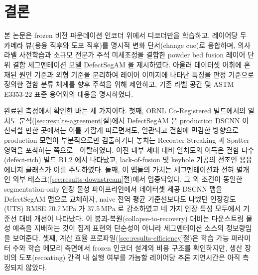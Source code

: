 \section{결론}
\label{sec:conclusion}

본 논문은 frozen 비전 파운데이션 인코더 위에서 디코더만을 학습하고,
레이어당 두 카메라 뷰(용융 직후와 도포 직후)를 명시적 변화 단서(change
cue)로 융합하며, 의사 라벨 사전학습과 소규모 전문가 주석 미세조정을
결합한 powder bed fusion 레이어 단위 결함 세그멘테이션 모델
DefectSegAM 을 제시하였다. 아울러 데이터셋 어휘에 혼재된 원인 기준과
외형 기준을 분리하여 레이어 이미지에 나타난 특징을 판정 기준으로 정의한
결함 분류 체계를 향후 주석을 위해 제안하고, 기존 라벨 공간 및 ASTM
E3353-22 표준 용어와의 대응을 명시하였다.

완료된 측정에서 확인한 바는 세 가지이다. 첫째, ORNL Co-Registered
빌드에서의 일치도 분석(\ref{sec:results-agreement}절)에서 DefectSegAM 은
production DSCNN 이 신뢰할 만한 곳에서는 이를 가깝게 따르면서도, 일관되고
결함에 민감한 방향으로---production 모델이 부분적으로만 검출하거나
놓치는 Recoater Streaking 과 Spatter 영역을 포착하는 쪽으로---이탈하였다.
이전 내부 세대 대비 일치도의 이득은 결함 다수(defect-rich) 빌드 B1.2 에서
나타났고, lack-of-fusion 및 keyhole 기공의 전조인 용융 에너지 클래스가
이를 주도하였다. 둘째, 이 맵들의 가치는 세그멘테이션과 전혀 별개인 외부
태스크(\ref{sec:results-downstream}절)에서 입증되었다. 그 외 조건이 동일한
segmentation-only 인장 물성 파이프라인에서 데이터셋 제공 DSCNN 맵을
DefectSegAM 맵으로 교체하자, naive 전역 평균 기준선보다도 나빴던
인장강도(UTS) RMSE 70.7\,MPa 가 37.5\,MPa 로 감소하였고 네 가지 인장 특성
모두에서 기준선 대비 개선이 나타났다. 이 붕괴-복원(collapse-to-recovery)
대비는 다운스트림 물성 예측을 지배하는 것이 집계 표현의 단순성이 아니라
세그멘테이션 소스의 정보량임을 보여준다. 셋째, 계산 효율
프로파일(\ref{sec:results-efficiency}절)은 학습 가능 파라미터 수와 학습
메모리 측면에서 frozen 인코더 설계의 비용 구조를 확인하지만, 생산 장비의
도포(recoating) 간격 내 실행 여부를 가늠할 레이어당 추론 지연시간은 아직
측정되지 않았다.

